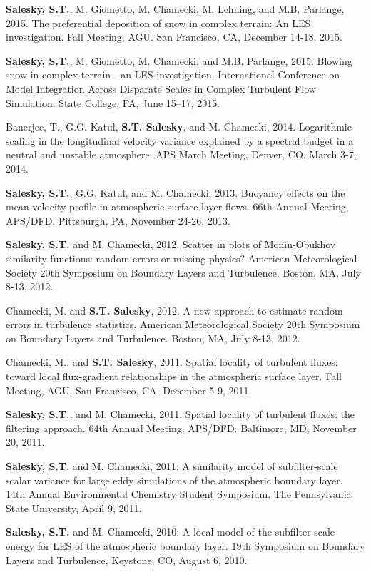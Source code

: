 \documentclass[11pt,letterpaper]{article}
\begin{document}
\textbf{Salesky, S.T.}, M. Giometto, M. Chamecki, M. Lehning, and M.B.
Parlange, 2015. The preferential deposition of snow in complex terrain: An LES
investigation. Fall Meeting, AGU. San Francisco, CA, December 14-18, 2015.

\textbf{Salesky, S.T.}, M. Giometto, M. Chamecki, and M.B. Parlange, 2015.
Blowing snow in complex terrain - an LES investigation. International
Conference on Model Integration Across Disparate Scales in Complex Turbulent
Flow Simulation. State College, PA, June 15--17, 2015. 

Banerjee, T., G.G. Katul, \textbf{S.T. Salesky}, and M. Chamecki, 2014.
Logarithmic scaling in the longitudinal velocity variance explained by a
spectral budget in a neutral and unstable atmosphere. APS March Meeting,
Denver, CO, March 3-7, 2014. 

\textbf{Salesky, S.T.}, G.G. Katul, and M. Chamecki, 2013. Buoyancy effects on
the mean velocity profile in atmospheric surface layer flows. 66th Annual
Meeting, APS/DFD. Pittsburgh, PA, November 24-26, 2013. 

\textbf{Salesky, S.T.} and M. Chamecki, 2012. Scatter in plots of Monin-Obukhov
similarity functions: random errors or missing physics? American Meteorological
Society 20th Symposium on Boundary Layers and Turbulence. Boston, MA, July
8-13, 2012. 

Chamecki, M. and \textbf{S.T. Salesky}, 2012. A new approach to estimate random
errors in turbulence statistics. American Meteorological Society 20th Symposium
on Boundary Layers and Turbulence. Boston, MA, July 8-13, 2012. 

Chamecki, M., and \textbf{S.T. Salesky}, 2011. Spatial locality of turbulent
fluxes: toward local flux-gradient relationships in the atmospheric surface
layer. Fall Meeting, AGU. San Francisco, CA, December 5-9, 2011. 

\textbf{Salesky, S.T.}, and M. Chamecki, 2011. Spatial locality of turbulent
fluxes: the filtering approach. 64th Annual Meeting, APS/DFD. Baltimore, MD,
November 20, 2011. 

\textbf{Salesky, S.T}. and M. Chamecki, 2011: A similarity model of
subfilter-scale scalar variance for large eddy simulations of the atmospheric
boundary layer. 14th Annual Environmental Chemistry Student Symposium. The
Pennsylvania State University, April 9, 2011. 

\textbf{Salesky, S.T.} and M. Chamecki, 2010: A local model of the
subfilter-scale energy for LES of the atmospheric boundary layer. 19th
Symposium on Boundary Layers and Turbulence, Keystone, CO, August 6, 2010. 
\end{document}
